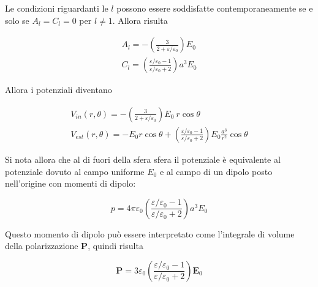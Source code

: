 Le condizioni riguardanti le $l$ possono essere soddisfatte contemporaneamente se e solo se $A_l = C_l = 0$ per $l \neq 1$. Allora risulta

\begin{align}
    A_l = - \left ( \frac{3}{2 + \varepsilon/\varepsilon_0} \right) E_0\\
    C_l = \left( \frac{\varepsilon/\varepsilon_0 - 1}{\varepsilon/\varepsilon_0 + 2} \right) a^3 E_0
\end{align}

\newpage

Allora i potenziali diventano 

\begin{tcolorbox}[colback=yellow!10!white, colframe=orange!70!black, boxrule=0.8pt]
\begin{align}
    V_{in} (r, \theta) = - \left ( \frac{3}{2 + \varepsilon/\varepsilon_0} \right) E_0 \ r \cos \theta\\
    V_{est} (r, \theta) = - E_0 r \cos \theta + \left( \frac{\varepsilon/\varepsilon_0 - 1}{\varepsilon/\varepsilon_0 + 2} \right) E_0 \frac{a^3}{r^2} \cos \theta
\end{align}
\end{tcolorbox}

Si nota allora che al di fuori della sfera sfera il potenziale è equivalente al potenziale dovuto al campo uniforme $E_0$ e al campo di un dipolo posto nell'origine con momenti di dipolo:

\begin{tcolorbox}[colback=yellow!10!white, colframe=orange!70!black, boxrule=0.8pt]
\begin{equation}
    p = 4 \pi \varepsilon_0 \left( \frac{\varepsilon/\varepsilon_0 - 1}{\varepsilon/\varepsilon_0 + 2} \right) a^3 E_0
\end{equation}
\end{tcolorbox}

Questo momento di dipolo può essere interpretato come l'integrale di volume della polarizzazione $\mathbf{P}$, quindi risulta 

\begin{tcolorbox}[colback=yellow!10!white, colframe=orange!70!black, boxrule=0.8pt]
\begin{equation}
    \mathbf{P} = 3 \varepsilon_0 \left( \frac{\varepsilon/\varepsilon_0 - 1}{\varepsilon/\varepsilon_0 + 2} \right)  \mathbf{E}_0
\end{equation}
\end{tcolorbox}

